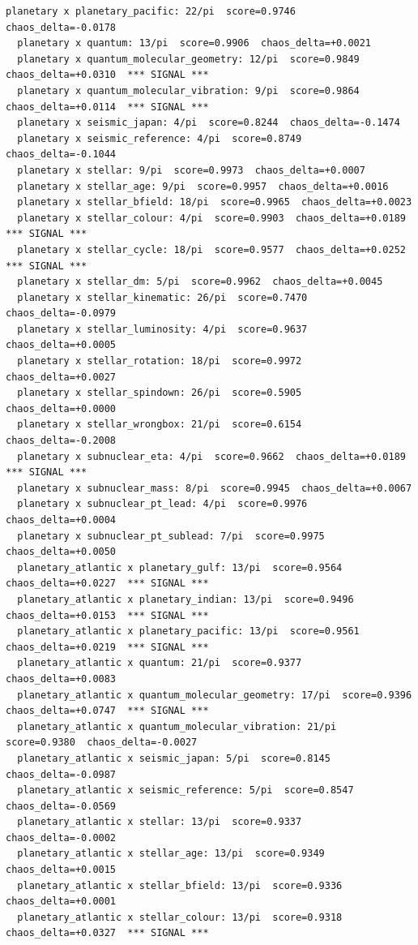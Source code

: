 \documentclass[11pt, letterpaper, openany]{book}
\begin{document}
\begin{empiricalbox}
\begin{lstlisting}[style=terminal]
  planetary x planetary_pacific: 22/pi  score=0.9746  chaos_delta=-0.0178
  planetary x quantum: 13/pi  score=0.9906  chaos_delta=+0.0021
  planetary x quantum_molecular_geometry: 12/pi  score=0.9849  chaos_delta=+0.0310  *** SIGNAL ***
  planetary x quantum_molecular_vibration: 9/pi  score=0.9864  chaos_delta=+0.0114  *** SIGNAL ***
  planetary x seismic_japan: 4/pi  score=0.8244  chaos_delta=-0.1474
  planetary x seismic_reference: 4/pi  score=0.8749  chaos_delta=-0.1044
  planetary x stellar: 9/pi  score=0.9973  chaos_delta=+0.0007
  planetary x stellar_age: 9/pi  score=0.9957  chaos_delta=+0.0016
  planetary x stellar_bfield: 18/pi  score=0.9965  chaos_delta=+0.0023
  planetary x stellar_colour: 4/pi  score=0.9903  chaos_delta=+0.0189  *** SIGNAL ***
  planetary x stellar_cycle: 18/pi  score=0.9577  chaos_delta=+0.0252  *** SIGNAL ***
  planetary x stellar_dm: 5/pi  score=0.9962  chaos_delta=+0.0045
  planetary x stellar_kinematic: 26/pi  score=0.7470  chaos_delta=-0.0979
  planetary x stellar_luminosity: 4/pi  score=0.9637  chaos_delta=+0.0005
  planetary x stellar_rotation: 18/pi  score=0.9972  chaos_delta=+0.0027
  planetary x stellar_spindown: 26/pi  score=0.5905  chaos_delta=+0.0000
  planetary x stellar_wrongbox: 21/pi  score=0.6154  chaos_delta=-0.2008
  planetary x subnuclear_eta: 4/pi  score=0.9662  chaos_delta=+0.0189  *** SIGNAL ***
  planetary x subnuclear_mass: 8/pi  score=0.9945  chaos_delta=+0.0067
  planetary x subnuclear_pt_lead: 4/pi  score=0.9976  chaos_delta=+0.0004
  planetary x subnuclear_pt_sublead: 7/pi  score=0.9975  chaos_delta=+0.0050
  planetary_atlantic x planetary_gulf: 13/pi  score=0.9564  chaos_delta=+0.0227  *** SIGNAL ***
  planetary_atlantic x planetary_indian: 13/pi  score=0.9496  chaos_delta=+0.0153  *** SIGNAL ***
  planetary_atlantic x planetary_pacific: 13/pi  score=0.9561  chaos_delta=+0.0219  *** SIGNAL ***
  planetary_atlantic x quantum: 21/pi  score=0.9377  chaos_delta=+0.0083
  planetary_atlantic x quantum_molecular_geometry: 17/pi  score=0.9396  chaos_delta=+0.0747  *** SIGNAL ***
  planetary_atlantic x quantum_molecular_vibration: 21/pi  score=0.9380  chaos_delta=-0.0027
  planetary_atlantic x seismic_japan: 5/pi  score=0.8145  chaos_delta=-0.0987
  planetary_atlantic x seismic_reference: 5/pi  score=0.8547  chaos_delta=-0.0569
  planetary_atlantic x stellar: 13/pi  score=0.9337  chaos_delta=-0.0002
  planetary_atlantic x stellar_age: 13/pi  score=0.9349  chaos_delta=+0.0015
  planetary_atlantic x stellar_bfield: 13/pi  score=0.9336  chaos_delta=+0.0001
  planetary_atlantic x stellar_colour: 13/pi  score=0.9318  chaos_delta=+0.0327  *** SIGNAL ***

\end{lstlisting}
\end{empiricalbox}
\end{document}
